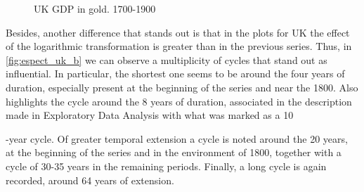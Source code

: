 \documentclass[a4paper]{article}
\begin{document}
\begin{figure}[H]
	\centering
	\caption{UK GDP in gold. 1700-1900} \label{fig:espect_uk}
\end{figure}

Besides, another difference that stands out is that in the plots for UK the effect of the logarithmic transformation is greater than in the previous series. Thus, in \ref {fig:espect_uk_b} we can observe a multiplicity of cycles that stand out as influential. In particular, the shortest one seems to be around the four years of duration, especially present at the beginning of the series and near the 1800. Also highlights the cycle around the 8 years of duration, associated in the description made in Exploratory Data Analysis with what was marked as a 10

-year cycle. Of greater temporal extension a cycle is noted around the 20 years, at the beginning of the series and in the environment of 1800, together with a cycle of 30-35 years in the remaining periods. Finally, a long cycle is again recorded, around 64 years of extension.
\end{document}
